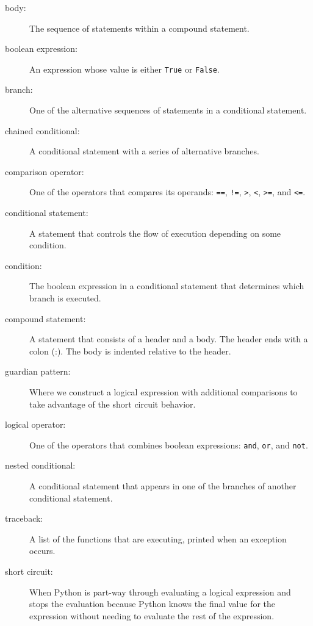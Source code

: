 \begin{description}

\item[body:] The sequence of statements within a compound statement.

\item[boolean expression:]  An expression whose value is either 
{\tt True} or {\tt False}.

\item[branch:] One of the alternative sequences of statements in
a conditional statement.

\item[chained conditional:]  A conditional statement with a series
of alternative branches.

\item[comparison operator:] One of the operators that compares
its operands: {\tt ==}, {\tt !=}, {\tt >}, {\tt <}, {\tt >=}, and {\tt <=}.

\item[conditional statement:]  A statement that controls the flow of
execution depending on some condition.

\item[condition:] The boolean expression in a conditional statement
that determines which branch is executed.

\item[compound statement:]  A statement that consists of a header
and a body.  The header ends with a colon (:).  The body is indented
relative to the header.

\item[guardian pattern:] Where we construct a logical expression 
with additional
comparisons to take advantage of the short circuit behavior.

\item[logical operator:] One of the operators that combines boolean
expressions: {\tt and}, {\tt or}, and {\tt not}.

\item[nested conditional:]  A conditional statement that appears
in one of the branches of another conditional statement.

\item[traceback:]  A list of the functions that are executing,
printed when an exception occurs.

\item[short circuit:]  When Python is part-way through evaluating a 
logical expression and stops the evaluation because Python 
knows the final value for the expression 
without needing to evaluate the rest of the expression.

\end{description}

